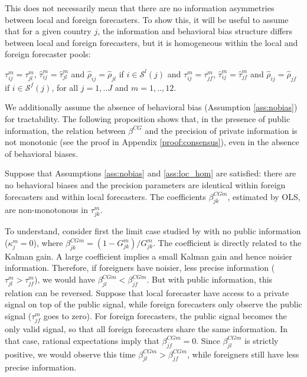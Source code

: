 This does not necessarily mean that there are no information asymmetries between local and foreign forecasters. To show this, it will be useful to assume that for a given country $j$, the information and behavioral bias structure differs between local and foreign forecasters, but it is homogeneous within the local and foreign forecaster pools:
\begin{assumption}\label{ass:loc_hom} $\tau_{ij}^m=\tau_{jl}^m$, $\hat\tau_{ij}^m=\hat\tau_{jl}^m$ and $\hat\rho_{ij}=\hat\rho_{jl}$ if $i\in\mathcal{S}^l(j)$ and $\tau_{ij}^m=\tau_{jf}^m$, $\hat\tau_{ij}^m=\hat\tau_{jf}^m$ and $\hat\rho_{ij}=\hat\rho_{jf}$ if $i\in\mathcal{S}^f(j)$, for all $j=1,..J$ and $m=1,..,12$.
\end{assumption}
We additionally assume the absence of behavioral bias (Assumption \ref{ass:nobias}) for tractability. The following proposition shows that, in the presence of public information, the relation between $\beta^{CG}$ and the precision of private information is not monotonic (see the proof in Appendix \ref{proof:consensus}), even in the absence of behavioral biases.

\begin{prop}\label{prop:consensus} Suppose that Assumptions \ref{ass:nobias} and \ref{ass:loc_hom} are satisfied: there are no behavioral biases and the precision parameters are identical within foreign forecasters and within local forecasters. The coefficients $\beta^{CGm}_{jk}$, estimated by OLS, are non-monotonous in $\tau_{jk}^m$.
\end{prop}
To understand, consider first the limit case studied by \citet{CoibionGorodnichenko2015} with no public information ($\kappa_j^m=0$), where $\beta^{CGm}_{jk}=(1-G_{jk}^m)/G_{jk}^m$. The coefficient is directly related to the Kalman gain. A large coefficient implies a small Kalman gain and hence noisier information. Therefore, if foreigners have noisier, less precise information ($\tau_{jl}^m>\tau_{jf}^m$), we would have $\beta^{CGm}_{jl}<\beta^{CGm}_{jf}$. But with public information, this relation can be reversed. Suppose that local forecaster have access to a private signal on top of the public signal, while foreign forecasters only observe the public signal ($\tau_{jf}^m$ goes to zero). For foreign forecasters, the public signal becomes the only valid signal, so that all foreign forecasters share the same information. In that case, rational expectations imply that $\beta^{CGm}_{jf}=0$. Since $\beta^{CGm}_{jl}$ is strictly positive, we would observe this time $\beta^{CGm}_{jl}>\beta^{CGm}_{jf}$, while foreigners still have less precise information.

